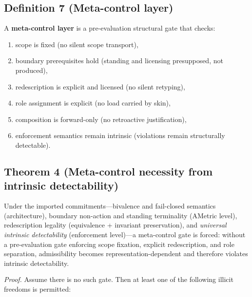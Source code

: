 \documentclass[12pt]{article}
\theoremstyle{plain}
\begin{document}
\subsection{Definition 7 (Meta-control layer)}

A \textbf{meta-control layer} is a pre-evaluation structural gate that checks:

\begin{enumerate}[leftmargin=*]
\item scope is fixed (no silent scope transport),
\item boundary prerequisites hold (standing and licensing presupposed, not produced),
\item redescription is explicit and licensed (no silent retyping),
\item role assignment is explicit (no load carried by skin),
\item composition is forward-only (no retroactive justification),
\item enforcement semantics remain intrinsic (violations remain structurally detectable).
\end{enumerate}

\subsection{Theorem 4 (Meta-control necessity from intrinsic detectability)}

Under the imported commitments---bivalence and fail-closed semantics (architecture), boundary non-action and standing terminality (AMetric level), redescription legality (equivalence + invariant preservation), and \emph{universal intrinsic detectability} (enforcement level)---a meta-control gate is forced: without a pre-evaluation gate enforcing scope fixation, explicit redescription, and role separation, admissibility becomes representation-dependent and therefore violates intrinsic detectability.

\textit{Proof.} Assume there is no such gate. Then at least one of the following illicit freedoms is permitted:
\end{document}
